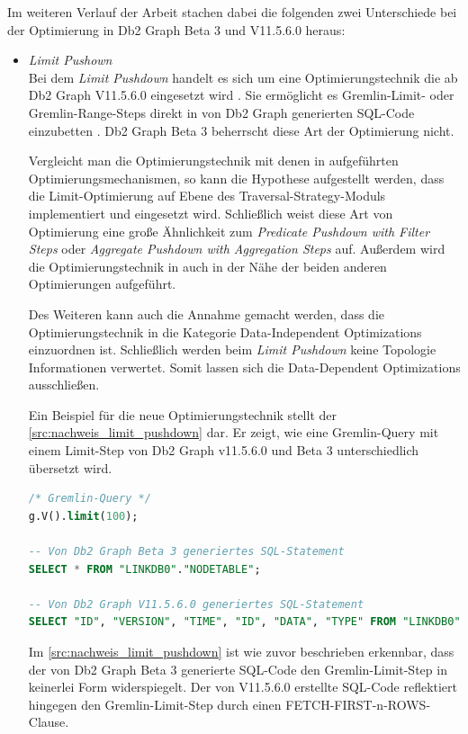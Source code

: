 Im weiteren Verlauf der Arbeit stachen dabei die folgenden zwei Unterschiede bei der Optimierung in Db2 Graph Beta 3 und V11.5.6.0 heraus:
\begin{itemize}
    \item \textit{Limit Pushown}\\
    Bei dem \textit{Limit Pushdown} handelt es sich um eine Optimierungstechnik die ab Db2 Graph V11.5.6.0 eingesetzt wird \cite{ibm_docs_optimize}. Sie ermöglicht es Gremlin-Limit- oder Gremlin-Range-Steps direkt in von Db2 Graph generierten SQL-Code einzubetten  \cite{ibm_docs_optimize}. Db2 Graph Beta 3 beherrscht diese Art der Optimierung nicht. 

    Vergleicht man die Optimierungstechnik mit denen in  aufgeführten Optimierungsmechanismen, so kann die Hypothese aufgestellt werden, dass die Limit-Optimierung auf Ebene des Traversal-Strategy-Moduls implementiert und eingesetzt wird. Schließlich weist diese Art von Optimierung eine große Ähnlichkeit zum \textit{Predicate Pushdown with Filter Steps} oder \textit{Aggregate Pushdown with Aggregation Steps} auf. Außerdem wird die Optimierungstechnik in \cite{ibm_docs_optimize} auch in der Nähe der beiden anderen Optimierungen aufgeführt. 
    
    Des Weiteren kann auch die Annahme gemacht werden, dass die Optimierungstechnik in die Kategorie Data-Independent Optimizations einzuordnen ist. Schließlich werden beim \textit{Limit Pushdown} keine Topologie Informationen verwertet. Somit lassen sich die Data-Dependent Optimizations ausschließen.

    Ein Beispiel für die neue Optimierungstechnik stellt der \autoref{src:nachweis_limit_pushdown} dar. Er zeigt, wie eine Gremlin-Query mit einem Limit-Step von Db2 Graph v11.5.6.0 und Beta 3 unterschiedlich übersetzt wird.

\begin{lstlisting}[label=src:nachweis_limit_pushdown,caption={Nachweis Limit Pushdown Optimierung},language=SQL]
/* Gremlin-Query */
g.V().limit(100);

-- Von Db2 Graph Beta 3 generiertes SQL-Statement
SELECT * FROM "LINKDB0"."NODETABLE";

-- Von Db2 Graph V11.5.6.0 generiertes SQL-Statement
SELECT "ID", "VERSION", "TIME", "ID", "DATA", "TYPE" FROM "LINKDB0"."NODETABLE" FETCH FIRST 100 ROWS;
\end{lstlisting}

    Im \autoref{src:nachweis_limit_pushdown} ist wie zuvor beschrieben erkennbar, dass der von Db2 Graph Beta 3 generierte SQL-Code den Gremlin-Limit-Step in keinerlei Form widerspiegelt. Der von V11.5.6.0 erstellte SQL-Code reflektiert hingegen den Gremlin-Limit-Step durch einen FETCH-FIRST-n-ROWS-Clause.


\end{itemize}
